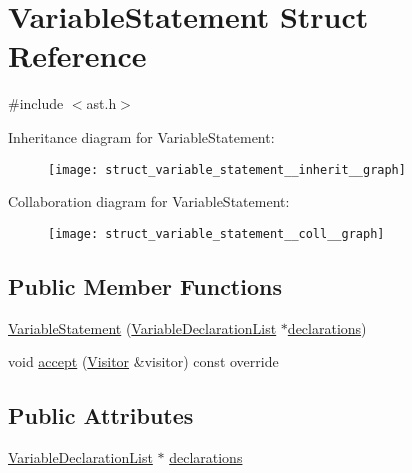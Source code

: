 \hypertarget{struct_variable_statement}{}\section{Variable\+Statement Struct Reference}
\label{struct_variable_statement}


{\ttfamily \#include $<$ast.\+h$>$}



Inheritance diagram for Variable\+Statement\+:\nopagebreak
\begin{figure}[H]
\begin{center}
\leavevmode
\texttt{[image: struct\_variable\_statement\_\_inherit\_\_graph]}
\end{center}
\end{figure}


Collaboration diagram for Variable\+Statement\+:\nopagebreak
\begin{figure}[H]
\begin{center}
\leavevmode
\texttt{[image: struct\_variable\_statement\_\_coll\_\_graph]}
\end{center}
\end{figure}
\subsection*{Public Member Functions}
\begin{DoxyCompactItemize}
\item 
\hyperlink{struct_variable_statement_a1ebce27ac048580b3a41723a2defd46a}{Variable\+Statement} (\hyperlink{struct_variable_declaration_list}{Variable\+Declaration\+List} $\ast$\hyperlink{struct_variable_statement_a9d1cdb228d5cb079e228180532cec942}{declarations})
\item 
void \hyperlink{struct_variable_statement_a55446c8cfa8fd620de4b72f7efca86bd}{accept} (\hyperlink{struct_visitor}{Visitor} \&visitor) const override
\end{DoxyCompactItemize}
\subsection*{Public Attributes}
\begin{DoxyCompactItemize}
\item 
\hyperlink{struct_variable_declaration_list}{Variable\+Declaration\+List} $\ast$ \hyperlink{struct_variable_statement_a9d1cdb228d5cb079e228180532cec942}{declarations}
\end{DoxyCompactItemize}


